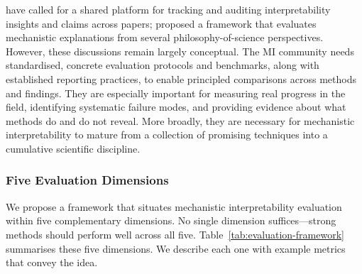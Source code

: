  have called for a shared platform for tracking and auditing interpretability insights and claims across papers;  proposed a framework that evaluates mechanistic explanations from several philosophy-of-science perspectives. However, these discussions remain largely conceptual. The MI community needs standardised, concrete evaluation protocols and benchmarks, along with established reporting practices, to enable principled comparisons across methods and findings. They are especially important for measuring real progress in the field, identifying systematic failure modes, and providing evidence about what methods do and do not reveal. More broadly, they are necessary for mechanistic interpretability to mature from a collection of promising techniques into a cumulative scientific discipline.

\subsubsection{Five Evaluation Dimensions}
\label{subsec:five eval dim}
We propose a framework that situates mechanistic interpretability evaluation within five complementary dimensions. No single dimension suffices---strong methods should perform well across all five. Table~\ref{tab:evaluation-framework} summarises these five dimensions. We describe each one with example metrics that convey the idea.

